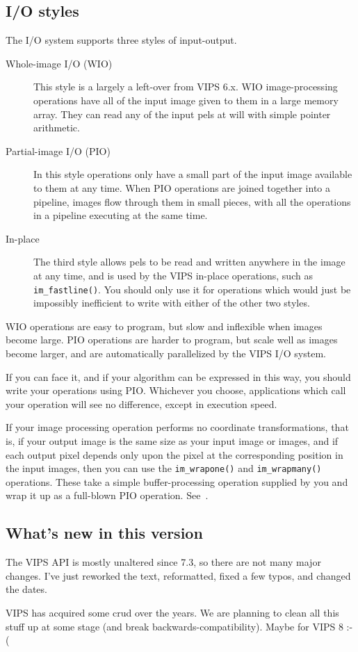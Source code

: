 \subsection{I/O styles}

The I/O system supports three styles of input-output. 

\begin{description}

\item[Whole-image I/O (WIO)]
This style is a largely a left-over from VIPS 6.x. WIO image-processing
operations have all of the input image given to them in a large memory
array. They can read any of the input pels at will with simple pointer
arithmetic.

\item[Partial-image I/O (PIO)]
In this style operations only have a small part of the input image available
to them at any time. When PIO operations are joined together into a pipeline,
images flow through them in small pieces, with all the operations in a
pipeline executing at the same time. 

\item[In-place]
The third style allows pels to be read and written anywhere in
the image at any time, and is used by the VIPS in-place operations, such
as \verb+im_fastline()+. You should only use it for operations which would
just be impossibly inefficient to write with either of the other two styles.

\end{description}

WIO operations are easy to program, but slow and inflexible when images
become large. PIO operations are harder to program, but scale well as images
become larger, and are automatically parallelized by the VIPS I/O system.

If you can face it, and if your algorithm can be expressed in this way, you
should write your operations using PIO.  Whichever you choose, applications
which call your operation will see no difference, except in execution speed.

If your image processing operation performs no coordinate transformations,
that is, if your output image is the same size as your input image or images,
and if each output pixel depends only upon the pixel at the corresponding
position in the input images, then you can use the \verb+im_wrapone()+
and \verb+im_wrapmany()+ operations. These take a simple buffer-processing
operation supplied by you and wrap it up as a full-blown PIO operation. 
See~.

\subsection{What's new in this version}

The VIPS API is mostly unaltered since 7.3, so there are not many major
changes. I've just reworked the text, reformatted, fixed a few typos,
and changed the dates.

VIPS has acquired some crud over the years. We are planning to clean all
this stuff up at some stage (and break backwards-compatibility). Maybe for
VIPS 8 :-(
